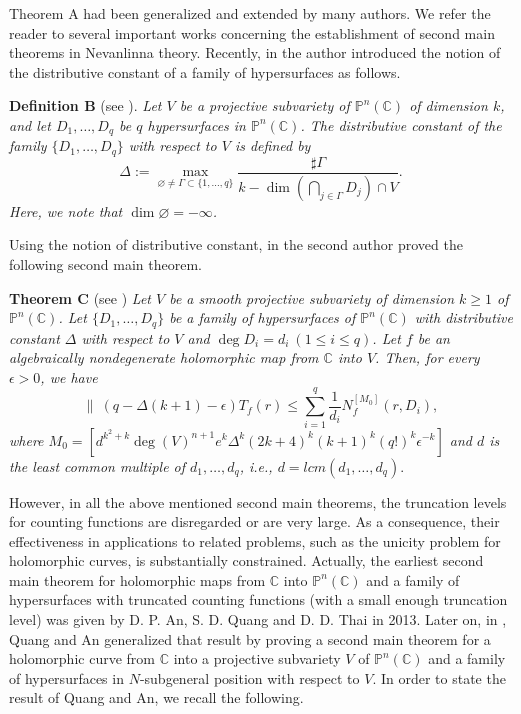 \documentclass[12pt]{amsart}
\newcommand{\C}{{\mathbb{C}}}
\renewcommand{\P}{{\mathbb{P}}}
\begin{document}
Theorem A had been generalized and extended by many authors. We refer the reader to several important works \cite{AP10,DT11,DT20,G,Q19, YYJ,XC} concerning the establishment of second main theorems in Nevanlinna theory. Recently, in \cite{Q21} the author introduced the notion of the distributive constant of a family of hypersurfaces as follows.   

\vskip0.2cm
\noindent
{\bf Definition B} (see \cite[Definition 1.1]{Q21}). {\it Let $V$ be a projective subvariety of $\P^n(\C)$ of dimension $k$, and let $D_1,\ldots,D_q$ be $q$ hypersurfaces in $\P^n(\C)$. The distributive constant of the family $\{D_1,\ldots,D_q\}$ with respect to $V$ is defined by
$$ \Delta:=\underset{\varnothing\ne\Gamma\subset\{1,\ldots,q\}}\max\dfrac{\sharp\Gamma}{k-\dim\left (\bigcap_{j\in\Gamma}D_j\right )\cap V}.$$
Here, we note that $\dim\varnothing =-\infty$.} 

Using the notion of distributive constant, in \cite{Q21} the second author proved the following second main theorem.

\vskip0.2cm
\noindent
\textbf{Theorem C} (see \cite[Theorem 1.2]{Q21}) {\it Let $V$ be a smooth projective subvariety of dimension $k\ge 1$ of $\P^n(\C)$. Let $\{D_1,\ldots,D_q\}$ be a family of hypersurfaces of $\P^n(\C)$ with distributive constant $\Delta$ with respect to $V$ and $\deg D_i=d_i\ (1\le i\le q)$. Let $f$ be an algebraically nondegenerate holomorphic map from $\C$ into $V$. Then, for every $\epsilon >0$, we have
$$\bigl \|\ \left (q-\Delta (k+1)-\epsilon\right) T_f(r)\le\sum_{i=1}^q\frac{1}{d_i}N^{[M_0]}_f(r,D_i),$$
where $M_0=\left[d^{k^2+k}\deg (V)^{n+1}e^k\Delta^k(2k+4)^k(k+1)^k(q!)^k\epsilon^{-k}\right]$ and $d$ is the least common multiple of $d_1,\ldots,d_q$, i.e., $d=lcm(d_1,\ldots,d_q).$}

However, in all the above mentioned second main theorems, the truncation levels for counting functions are disregarded or are very large. As a consequence, their effectiveness in applications to related problems, such as the unicity problem for holomorphic curves, is substantially constrained. Actually, the earliest second main theorem for holomorphic maps from $\C$ into $\P^n(\C)$ and a family of hypersurfaces with truncated counting functions (with a small enough truncation level) was given by D. P. An, S. D. Quang and D. D. Thai  \cite{TAQ} in 2013. Later on, in \cite{QA}, Quang and An generalized that result by proving a second main theorem for a holomorphic curve from $\C$ into a projective subvariety $V$ of $\P^n(\C)$ and a family of hypersurfaces in $N$-subgeneral position with respect to $V$. In order to state the result of Quang and An, we recall the following.
\end{document}
